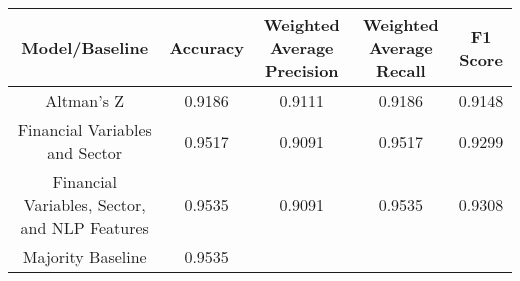 \footnotesize
\begin{tabular}{ccccc}
\toprule
Model/Baseline & Accuracy & Weighted Average Precision & Weighted Average Recall & F1 Score \\
\midrule
Altman's Z & 0.9186 & 0.9111 & 0.9186 & 0.9148 \\
Financial Variables and Sector & 0.9517 & 0.9091 & 0.9517 & 0.9299 \\
Financial Variables, Sector, and NLP Features & 0.9535 & 0.9091 & 0.9535 & 0.9308 \\
Majority Baseline & 0.9535 &  &  &  \\
\bottomrule
\end{tabular}

\normalsize